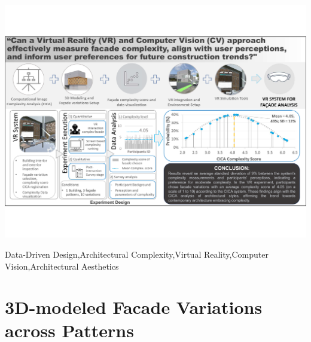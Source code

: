 \documentclass[final,5p,times]{elsarticle}%
\begin{document}
\begin{frontmatter}
\begin{graphicalabstract}
    \centering
    \includegraphics[width= \textwidth, trim = 0 80 0 80, clip]{Images/GraphicAbstract}
    \label{fig:graphic_abstract}
\end{graphicalabstract}

\begin{highlights}

\end{highlights}

\begin{keyword}
Data-Driven Design\sep Architectural Complexity\sep Virtual Reality\sep Computer Vision\sep Architectural Aesthetics

\end{keyword}

\end{frontmatter}
%






\appendix

\section{3D-modeled Facade Variations across Patterns}
\label{sec:AnnexVariations}

\end{document}
